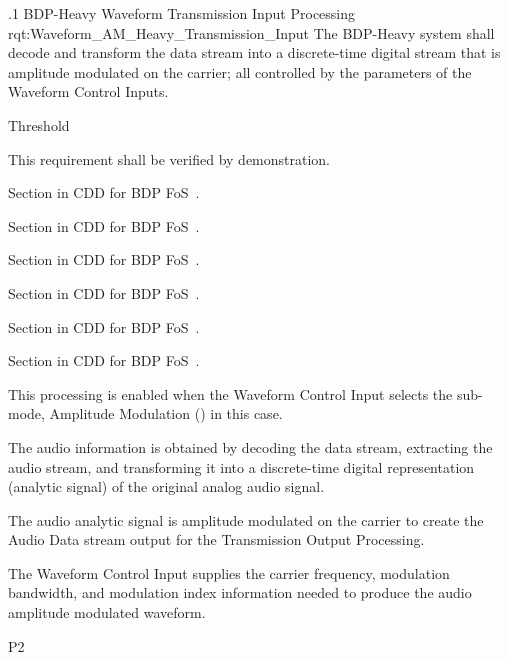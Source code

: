 \ONERQMTVKPP
{\RqtNumberBase.1}
{BDP-Heavy \AM Waveform Transmission Input Processing}
{rqt:Waveform_AM_Heavy_Transmission_Input}
{The BDP-Heavy system shall decode and transform the \MPEGTS data stream into a discrete-time digital stream that is amplitude modulated on the \RF carrier; all controlled by the parameters of the Waveform Control Inputs.}
{
	\item [Phase 1]  Threshold
}
{This requirement shall be verified by demonstration.}
{
	\item [5.1.1] Section in CDD for BDP FoS~\cite{ref__BDP_FOS_CDD}.
	\item [5.1.2] Section in CDD for BDP FoS~\cite{ref__BDP_FOS_CDD}.
	\item [5.5.1] Section in CDD for BDP FoS~\cite{ref__BDP_FOS_CDD}.
	\item [5.5.2] Section in CDD for BDP FoS~\cite{ref__BDP_FOS_CDD}.
	\item [5.5.3] Section in CDD for BDP FoS~\cite{ref__BDP_FOS_CDD}.
	\item [5.5.4] Section in CDD for BDP FoS~\cite{ref__BDP_FOS_CDD}.
}
{
	\item This processing is enabled when the Waveform Control Input selects the sub-mode, Amplitude Modulation (\AM) in this case.
	\item The audio information is obtained by decoding the \MPEGTS data stream, extracting the audio stream, and transforming it into a discrete-time digital representation (analytic signal) of the original analog audio signal.
	\item The audio analytic signal is amplitude modulated on the \RF carrier to create the Audio Data stream output for the Transmission Output Processing.
	\item The Waveform Control Input supplies the \RF carrier frequency, modulation bandwidth, and modulation index information needed to produce the audio amplitude modulated \RF waveform.
}
{P2}


